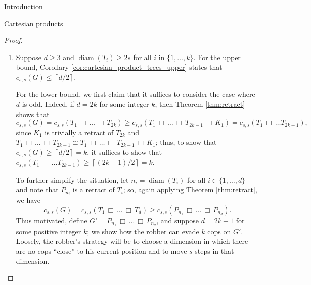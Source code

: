 \documentclass[12pt]{amsart}
\newcommand{\ceil}[1]{\ensuremath{\left\lceil #1\right\rceil} }
\theoremstyle{definition}
\DeclareMathOperator{\diam}{diam}
\def\cart{\, \Box \,}
\newcommand{\speeds}{c_{s,s}}
\begin{document}
\begin{section}{Introduction}
\begin{section}{Cartesian products}
\begin{proof}
\begin{enumerate}[label={\textbf{(\alph*)}}]
    The cop now seeks to realize $D(1) = D(2) = 1$.  If this is not already the case, one of $D(1)$ and $D(2)$ must be 1 and the other 0; without loss of generality, suppose $D(1) = 1$ and $D(2) = 0$.  Henceforth, if on any turn the robber ever takes fewer than $s$ steps away from the cop, then she may move so as to make $D(1)=D(2)=1$ on her next turn.  Likewise, if the robber ever moves in dimension 2, then the cop may again force $D(1)=D(2)=1$ on her next turn.  Thus the robber must take $s$ steps away from the cop in dimension 1 on each robber turn; since $T_1$ is a tree, the robber cannot keep this up indefinitely.  Hence the cop can eventually force $D(1)=D(2)=1$.

    From this point forward, if on any robber turn the robber takes even a single step toward the cop, then she will be able to capture him on her ensuing turn.  Likewise, if the robber takes $s-2$ steps or fewer on any turn, then the cop can capture him.  Hence, the robber must take at least $s-1$ steps away from the cop on every turn.  However, as argued above, he cannot keep this up forever: on some robber turn he will be forced to take fewer than $s-1$ steps or take at least one step toward the cop, so the cop can capture him on the ensuing cop turn.\\
    
    \item Suppose $d \ge 3$ and $\diam(T_i) \ge 2s$ for all $i$ in $\{1, \dots, k\}$.  For the upper bound, Corollary \ref{cor:cartesian_product_trees_upper} states that $\speeds(G) \le \ceil{d/2}$.  
    
    For the lower bound, we first claim that it suffices to consider the case where $d$ is odd.  Indeed, if $d = 2k$ for some integer $k$, then Theorem \ref{thm:retract} shows that 
    \[\speeds(G) = \speeds(T_1 \cart \dots \cart T_{2k}) \ge \speeds(T_1 \cart \dots \cart T_{2k-1} \cart K_1) = \speeds(T_1 \cart \dots T_{2k-1}),\]
    since $K_1$ is trivially a retract of $T_{2k}$ and $T_1 \cart \dots \cart T_{2k-1}\cong T_1 \cart \dots \cart T_{2k-1}\cart K_1$; thus, to show that $\speeds(G) \ge \ceil{d/2} = k$, it suffices to show that $\speeds(T_1 \cart \dots T_{2k-1}) \ge \ceil{(2k-1)/2} = k$.  
    
    To further simplify the situation, let $n_i = \diam(T_i)$ for all $i \in \{1, \dots, d\}$ and note that $P_{n_i}$ is a retract of $T_i$; so, again applying Theorem \ref{thm:retract}, we have
    $$\speeds(G) = \speeds(T_1 \cart \dots \cart T_d) \ge \speeds(P_{n_1} \cart \dots \cart P_{n_d}).$$
    Thus motivated, define $G' = P_{n_1} \cart \dots \cart P_{n_d}$, and suppose $d=2k+1$ for some positive integer $k$; we show how the robber can evade $k$ cops on $G'$.  Loosely, the robber's strategy will be to choose a dimension in which there are no cops ``close'' to his current position and to move $s$ steps in that dimension.  
    

\end{enumerate}
\end{proof}
\end{section}
\end{section}
\end{document}

